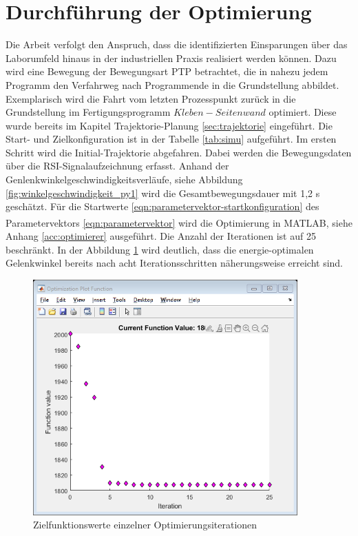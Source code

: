 \section{Durchführung der Optimierung}
Die Arbeit verfolgt den Anspruch, dass die identifizierten Einsparungen über das Laborumfeld hinaus in der industriellen Praxis realisiert werden können. Dazu wird eine Bewegung der Bewegungsart PTP betrachtet, die in nahezu jedem Programm den Verfahrweg nach Programmende in die Grundstellung abbildet. Exemplarisch wird die Fahrt vom letzten Prozesspunkt zurück in die Grundstellung im Fertigungsprogramm  $Kleben-Seitenwand$  optimiert. Diese wurde bereits im Kapitel Trajektorie-Planung \ref{sec:trajektorie} eingeführt. Die Start- und Zielkonfiguration ist in der Tabelle \ref{tab:simu} aufgeführt.  Im ersten Schritt wird die Initial-Trajektorie abgefahren. Dabei werden die Bewegungsdaten über die RSI-Signalaufzeichnung erfasst. Anhand der Genlenkwinkelgeschwindigkeitsverläufe, siehe Abbildung \ref{fig:winkelgeschwindigkeit_py1} wird die Gesamtbewegungsdauer mit 1,2 s geschätzt. Für die Startwerte \ref{eqn:parametervektor-startkonfiguration} des Parametervektors \ref{eqn:parametervektor} wird die Optimierung in MATLAB\textsuperscript{\textregistered}, siehe Anhang \ref{acc:optimierer} ausgeführt. Die Anzahl der Iterationen ist auf 25 beschränkt. In der Abbildung \ref{fig:funktionswerte-iteration} wird deutlich, dass die energie-optimalen Gelenkwinkel bereits nach acht Iterationsschritten näherungsweise erreicht sind.
%
\begin{figure}[tbph]
	\centering
	\includegraphics [width=4in]{images/optimization_01}
	\caption{Zielfunktionswerte einzelner Optimierungsiterationen}
	\label{fig:funktionswerte-iteration}
\end{figure}
%
